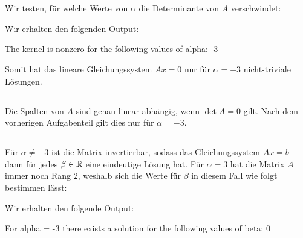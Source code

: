 \section{}





\subsection{}

Wir testen, für welche Werte von $\alpha$ die Determinante von $A$ verschwindet:



Wir erhalten den folgenden Output:

\begin{consoleoutput}
The kernel is nonzero for the following values of alpha:
{-3}
\end{consoleoutput}

Somit hat das lineare Gleichungssystem $Ax = 0$ nur für $\alpha = -3$ nicht-triviale Lösungen.





\subsection{}

Die Spalten von $A$ sind genau linear abhängig, wenn $\det A = 0$ gilt.
Nach dem vorherigen Aufgabenteil gilt dies nur für $\alpha = -3$.





\subsection{}

Für $\alpha \neq -3$ ist die Matrix invertierbar, sodass das Gleichungssystem $Ax = b$ dann für jedes $\beta \in \mathbb{R}$ eine eindeutige Lösung hat.
Für $\alpha = 3$ hat die Matrix $A$ immer noch Rang $2$, weshalb sich die Werte für $\beta$ in diesem Fall wie folgt bestimmen lässt:



Wir erhalten den folgende Output:

\begin{consoleoutput}
For alpha = -3 there exists a solution for the following values of beta:
{0}
\end{consoleoutput}





